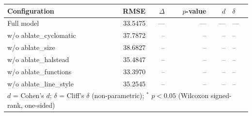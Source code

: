 \begin{tabular}{lrrrrl}
\toprule
Configuration & RMSE & $\Delta$ & $p$-value & $d$ & $\delta$ \\
\midrule
Full model & 33.5475 & --- & --- & --- & --- \\
\quad w/o ablate\_cyclomatic & 37.7872 & -- & -- & -- & -- \\
\quad w/o ablate\_size & 38.6827 & -- & -- & -- & -- \\
\quad w/o ablate\_halstead & 35.4847 & -- & -- & -- & -- \\
\quad w/o ablate\_functions & 33.3970 & -- & -- & -- & -- \\
\quad w/o ablate\_line\_style & 35.2545 & -- & -- & -- & -- \\
\bottomrule
\multicolumn{6}{l}{\footnotesize $d$ = Cohen's $d$;\; $\delta$ = Cliff's $\delta$ (non-parametric); $^{*}$ $p < 0.05$ (Wilcoxon signed-rank, one-sided)}
\end{tabular}